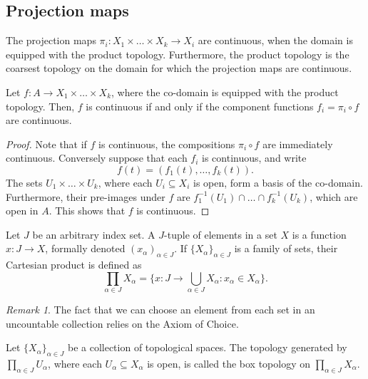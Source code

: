 \documentclass[11pt]{article}
\theoremstyle{definition}
\theoremstyle{remark}
\newtheorem*{remark}{Remark}
\numberwithin{equation}{section}
\begin{document}
    \subsection{Projection maps}

    \begin{theorem}
        The projection maps $\pi_i\colon X_1\times \dots \times X_k \to X_i$ are
        continuous, when the domain is equipped with the product topology.
        Furthermore, the product topology is the coarsest topology on the domain for
        which the projection maps are continuous.
    \end{theorem}

    \begin{lemma}
        Let $f\colon A \to X_1 \times \dots \times X_k$, where the co-domain is
        equipped with the product topology. Then, $f$ is continuous if and only if
        the component functions $f_i = \pi_i\circ f$ are continuous.
    \end{lemma}
    \begin{proof}
        Note that if $f$ is continuous, the compositions $\pi_i\circ f$ are
        immediately continuous. Conversely suppose that each $f_i$ is continuous, and
        write \[
            f(t) = (f_1(t), \dots, f_k(t)).
        \] The sets $U_1 \times \dots \times U_k$, where each $U_i \subseteq X_i$ is
        open, form a basis of the co-domain. Furthermore, their pre-images under $f$
        are $f_1^{-1}(U_1) \cap \dots \cap f_k^{-1}(U_k)$, which are open in $A$.
        This shows that $f$ is continuous.
    \end{proof}


    \begin{definition}
        Let $J$ be an arbitrary index set. A $J$-tuple of elements in a set $X$ is a
        function $x\colon J \to X$, formally denoted $(x_\alpha)_{\alpha \in J}$.
        If $\{X_\alpha\}_{\alpha \in J}$ is a family of sets, their Cartesian product
        is defined as \[
            \prod_{\alpha \in J} X_\alpha = \{x\colon J \to \bigcup_{\alpha \in J}
            X_\alpha\colon x_\alpha \in X_\alpha\}.
        \] 
        \begin{remark}
            The fact that we can choose an element from each set in an uncountable
            collection relies on the Axiom of Choice.
        \end{remark}
    \end{definition}

    \begin{definition}
        Let $\{X_\alpha\}_{\alpha \in J}$ be a collection of topological spaces. The
        topology generated by $\prod_{\alpha \in J} U_\alpha$, where each $U_\alpha
        \subseteq X_\alpha$ is open, is called the box topology on $\prod_{\alpha \in
        J} X_\alpha$.
    \end{definition}
    
\end{document}
